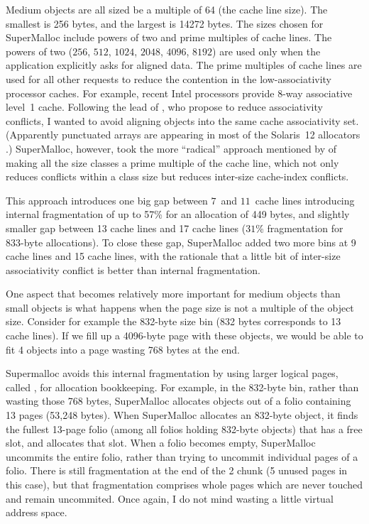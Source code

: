 \documentclass[natbib,sort&compress,10pt]{sigplanconf}
\begin{document}
Medium objects are all sized be a multiple of 64 (the cache line
size).  The smallest is 256 bytes, and the largest is 14272 bytes.
The sizes chosen for SuperMalloc include powers of two and prime
multiples of cache lines.  The powers of two ($256$, $512$, $1024$,
$2048$, $4096$, $8192$) are used only when the application explicitly
asks for aligned data.  The prime multiples of cache lines are used
for all other requests to reduce the contention in the
low-associativity processor caches. For example, recent Intel
processors provide 8-way associative level~1 cache.  Following the
lead of \cite{AfekDiMo11}, who propose  to
reduce associativity conflicts, I wanted to avoid aligning objects
into the same cache associativity set. (Apparently punctuated arrays
are appearing in most of the Solaris~12 allocators \cite{Dice14b}.)
SuperMalloc, however, took the more ``radical'' approach mentioned by
\cite{Dice14a} of making all the size classes a prime multiple of the
cache line, which not only reduces conflicts within a class size but
reduces inter-size cache-index conflicts.

This approach introduces one big gap between $7$~and $11$~cache lines
introducing internal fragmentation of up to 57\% for an allocation of
449 bytes, and slightly smaller gap between 13 cache lines and 17
cache lines ($31$\% fragmentation for 833-byte allocations).  To close
these gap, SuperMalloc added two more bins at 9 cache lines and 15
cache lines, with the rationale that a little bit of inter-size
associativity conflict is better than internal fragmentation.

One aspect that becomes relatively more important for medium objects
than small objects is what happens when the page size is not a
multiple of the object size.  Consider for example the 832-byte size
bin (832 bytes corresponds to 13 cache lines).  If we fill up a
4096-byte page with these objects, we would be able to fit 4 objects
into a page wasting 768 bytes at the end.  

Supermalloc avoids this internal fragmentation by using larger logical
pages, called , for allocation bookkeeping.  For example,
in the 832-byte bin, rather than wasting those 768 bytes, SuperMalloc
allocates objects out of a folio containing 13 pages (53,248
bytes). When SuperMalloc allocates an 832-byte object, it finds the
fullest 13-page folio (among all folios holding 832-byte objects) that
has a free slot, and allocates that slot.  When a folio becomes empty,
SuperMalloc uncommits the entire folio, rather than trying to uncommit
individual pages of a folio.  There is still fragmentation at the end
of the \unit{2}\mebi\byte{} chunk (5 unused pages in this case), but
that fragmentation comprises whole pages which are never touched and
remain uncommited.  Once again, I do not mind wasting a little virtual
address space.
\end{document}
